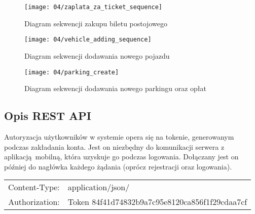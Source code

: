 \begin{figure}[p]
	\begin{center}
		\texttt{[image: 04/zaplata\_za\_ticket\_sequence]}
	\end{center}
	\caption{Diagram sekwencji zakupu biletu postojowego}
\end{figure}

\begin{figure}[p]
	\begin{center}
		\texttt{[image: 04/vehicle\_adding\_sequence]}
	\end{center}
	\caption{Diagram sekwencji dodawania nowego pojazdu}
\end{figure}

\begin{figure}[p]
	\begin{center}
		\texttt{[image: 04/parking\_create]}
	\end{center}
	\caption{Diagram sekwencji dodawania nowego parkingu oraz opłat}
\end{figure}

\newpage



\subsection{Opis REST API}

Autoryzacja użytkowników w systemie opera się na tokenie, generowanym podczas zakładania konta. Jest on niezbędny do komunikacji serwera z aplikacją mobilną, która uzyskuje go podczas logowania. Dołączany jest on później do nagłówka każdego żądania (oprócz rejestracji oraz logowania).

\vspace{-0.3cm}
\begin{table}[h]
	\begin{center}
		\begin{tabular}{ rl }
			Content-Type:&application/json/\\
			Authorization:&Token 84f41d74832b9a7c95e8120ca856f1f29cdaa7cf\\
		\end{tabular}
	\end{center}
\end{table}

